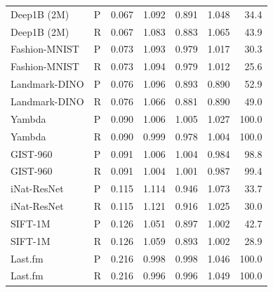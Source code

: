 \begin{tabular}{llrrrrr}
Deep1B (2M) & P & 0.067 & 1.092 & 0.891 & 1.048 & 34.4 \\
Deep1B (2M) & R & 0.067 & 1.083 & 0.883 & 1.065 & 43.9 \\
Fashion-MNIST & P & 0.073 & 1.093 & 0.979 & 1.017 & 30.3 \\
Fashion-MNIST & R & 0.073 & 1.094 & 0.979 & 1.012 & 25.6 \\
Landmark-DINO & P & 0.076 & 1.096 & 0.893 & 0.890 & 52.9 \\
Landmark-DINO & R & 0.076 & 1.066 & 0.881 & 0.890 & 49.0 \\
Yambda & P & 0.090 & 1.006 & 1.005 & 1.027 & 100.0 \\
Yambda & R & 0.090 & 0.999 & 0.978 & 1.004 & 100.0 \\
GIST-960 & P & 0.091 & 1.006 & 1.004 & 0.984 & 98.8 \\
GIST-960 & R & 0.091 & 1.004 & 1.001 & 0.987 & 99.4 \\
iNat-ResNet & P & 0.115 & 1.114 & 0.946 & 1.073 & 33.7 \\
iNat-ResNet & R & 0.115 & 1.121 & 0.916 & 1.025 & 30.0 \\
SIFT-1M & P & 0.126 & 1.051 & 0.897 & 1.002 & 42.7 \\
SIFT-1M & R & 0.126 & 1.059 & 0.893 & 1.002 & 28.9 \\
Last.fm & P & 0.216 & 0.998 & 0.998 & 1.046 & 100.0 \\
Last.fm & R & 0.216 & 0.996 & 0.996 & 1.049 & 100.0 \\
\bottomrule
\end{tabular}
